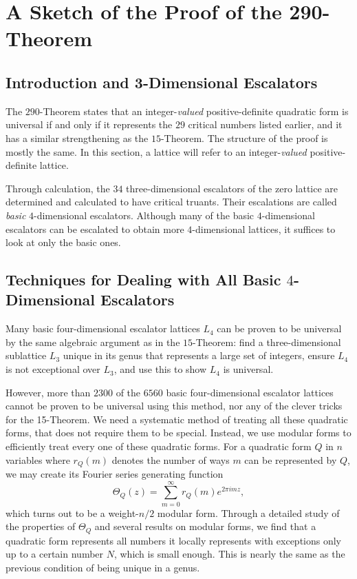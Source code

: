 \documentclass[letterpaper, 12pt]{article}
\begin{document}
\section{A Sketch of the Proof of the 290-Theorem}
\subsection{Introduction and 3-Dimensional Escalators}
The $290$-Theorem \cite{twoninety} states that an integer-\emph{valued} positive-definite quadratic form is universal if and only if it represents the $29$ critical numbers listed earlier,
and it has a similar strengthening as the $15$-Theorem.
The structure of the proof is mostly the same.
In this section, a lattice will refer to an integer-\emph{valued} positive-definite lattice.

Through calculation, the $34$ three-dimensional escalators of the zero lattice are determined and calculated to have critical truants.
Their escalations are called \emph{basic} $4$-dimensional escalators. Although many of the basic $4$-dimensional escalators can be escalated to obtain more $4$-dimensional lattices, it suffices to look at only the basic ones.

\subsection{Techniques for Dealing with All Basic $4$-Dimensional Escalators}
Many basic four-dimensional escalator lattices $L_4$ can be proven to be universal by the same algebraic argument as in the $15$-Theorem:
find a three-dimensional sublattice $L_3$ unique in its genus that represents a large set of integers, ensure $L_4$ is not exceptional over $L_3$, and use this to show $L_4$ is universal.

However, more than $2300$ of the $6560$ basic four-dimensional escalator lattices cannot be proven to be universal using this method, nor any of the clever tricks for the 15-Theorem. We need a systematic method of treating all these quadratic forms, that does not require them to be special.
Instead, we use modular forms to efficiently treat every one of these quadratic forms. For a quadratic form $Q$ in $n$ variables where $r_Q(m)$ denotes the number of ways $m$ can be represented by $Q$, we may create its Fourier series generating function
\[\Theta_Q(z) = \sum_{m = 0}^{\infty} r_Q(m) e^{2\pi i m z},\]
which turns out to be a weight-$n/2$ modular form. Through a detailed study of the properties of $\Theta_Q$ and several results on modular forms, we find that a quadratic form represents all numbers it locally represents with exceptions only up to a certain number $N$, which is small enough. This is nearly the same as the previous condition of being unique in a genus.
\end{document}
